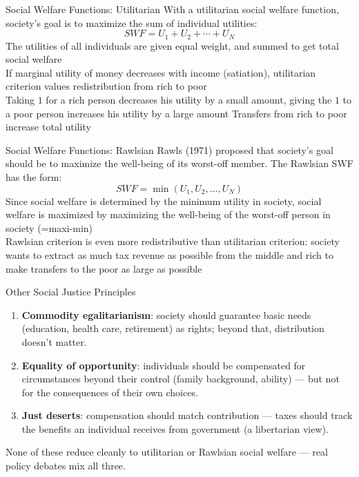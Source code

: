 \documentclass[11pt,aspectratio=169]{beamer}
\begin{document}
\begin{frame}{Social Welfare Functions: Utilitarian}
	With a utilitarian social welfare function, society’s goal is to maximize the sum of
	individual utilities:
	      \[SWF = U_1 + U_2 + \cdots + U_N\]
	The utilities of all individuals are given equal weight, and summed to get total social
	welfare \\
	If marginal utility of money decreases with income (satiation), utilitarian criterion
	values redistribution from rich to poor \\
	Taking $1$ for a rich person decreases his utility by a small amount, giving the $1$ to a
	poor person increases his utility by a large amount
   Transfers from rich to poor increase total utility

\end{frame}
\begin{frame}{Social Welfare Functions: Rawlsian}
Rawls (1971) proposed that society’s goal should be to maximize the well-being of its
worst-off member. The Rawlsian SWF has the form:
       \[SWF = \min(U_1, U_2, \ldots, U_N)\]
Since social welfare is determined by the minimum utility in society, social welfare is
maximized by maximizing the well-being of the worst-off person in society
(=maxi-min) \\
Rawlsian criterion is even more redistributive than utilitarian criterion: society wants
to extract as much tax revenue as possible from the middle and rich to make transfers
to the poor as large as possible

   
       
\end{frame}

\begin{frame}{Other Social Justice Principles}
  \begin{enumerate}
    \item \textbf{Commodity egalitarianism}: society should guarantee basic needs (education, health care, retirement) as rights; beyond that, distribution doesn't matter.
    \item \textbf{Equality of opportunity}: individuals should be compensated for circumstances beyond their control (family background, ability) --- but not for the consequences of their own choices.
    \item \textbf{Just deserts}: compensation should match contribution --- taxes should track the benefits an individual receives from government (a libertarian view).
  \end{enumerate}
  \vspace{0.3em}
  \centering \small
  None of these reduce cleanly to utilitarian or Rawlsian social welfare --- real policy debates mix all three.
\end{frame}
\end{document}
